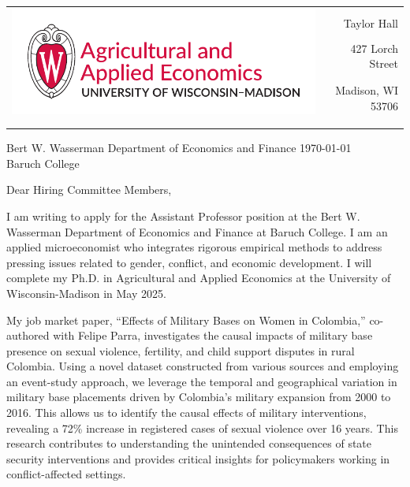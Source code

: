 \documentclass[12pt]{letter}
\begin{document}
\begin{tabularx}{\textwidth}{Xr}
\multirow{4}{*}{\includegraphics[height=3\baselineskip]{logo_cropped.pdf}} &  \\
& Taylor Hall \\
& 427 Lorch Street \\
& Madison, WI 53706 \\
[-1.8ex]\\
\\
\end{tabularx}

Bert W. Wasserman Department of Economics and Finance \hfill \today \\
Baruch College
\medskip

Dear Hiring Committee Members,

I am writing to apply for the Assistant Professor position at the  Bert W. Wasserman Department of Economics and Finance at Baruch College. 
I am an applied microeconomist who integrates rigorous empirical methods to address pressing issues related to gender, conflict, and economic development.
I will complete my Ph.D. in Agricultural and Applied Economics at the University of Wisconsin-Madison in May 2025. 

My job market paper, “Effects of Military Bases on Women in Colombia,” co-authored with Felipe Parra, investigates the causal impacts of military base presence 
on sexual violence, fertility, and child support disputes in rural Colombia. Using a novel dataset constructed from various sources and employing an event-study approach, 
we leverage the temporal and geographical variation in military base placements driven by Colombia's military expansion from 2000 to 2016. This allows us to identify 
the causal effects of military interventions, revealing a 72\% increase in registered cases of sexual violence over 16 years. 
This research contributes to understanding the unintended consequences of state security interventions and provides critical insights 
for policymakers working in conflict-affected settings.
\end{document}

